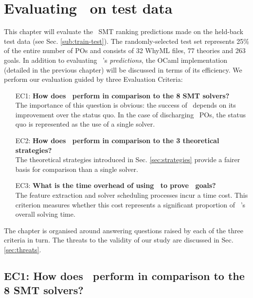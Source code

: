 \chapter{Evaluating \where~on test data}%
\thispagestyle{nohead}
\label{Evaluation} 

This chapter will evaluate the \where~SMT ranking predictions made on the held-back test data (see Sec. \ref{sub:train-test}).
The randomly-selected test set represents 25\% of the entire number of POs and consists of 32 WhyML files, 77 theories and 263 goals.
In addition to evaluating \where~'s \textit{predictions}, the OCaml implementation (detailed in the previous chapter) will be discussed in terms of its efficiency.   
We perform our evaluation guided by three Evaluation Criteria:
\begin{itemize}
	\item[EC1:] \textbf{How does \where~perform in comparison to the 8 SMT solvers?}\\
	The importance of this question is obvious: the success of \where~depends on its improvement over the status quo. In the case of discharging \why~POs, the status quo is represented as the use of a single solver.
	\item[EC2:] \textbf{How does \where~perform in comparison to the 3 theoretical strategies?}\\
	The theoretical strategies introduced in Sec. \ref{sec:strategies} provide a fairer basis for comparison than a single solver.
	\item[EC3:] \textbf{What is the time overhead of using \where~to prove \why~goals?}\\
	The feature extraction and solver scheduling processes incur a time cost. This criterion measures whether this cost represents a significant proportion of \where~'s overall solving time.    	
\end{itemize}
The chapter is organised around answering questions raised by each of the three criteria in turn.
The threats to the validity of our study are discussed in Sec. \ref{sec:threats}. 

\section{EC1: How does \where~perform in comparison to the 8 SMT solvers?}


